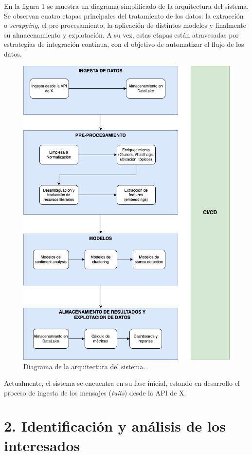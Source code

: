 \documentclass[
11pt, %
]{charter}
\begin{document}
En la figura 1 se muestra un diagrama simplificado de la arquitectura del sistema. Se observan cuatro etapas principales del tratamiento de los datos: la extracción o \textit{scrapping}, el pre-procesamiento, la aplicación de distintos modelos y finalmente su almacenamiento y explotación. A su vez, estas etapas están atravesadas por estrategias de integración continua, con el objetivo de automatizar el flujo de los datos.

\begin{figure}[H]
\centering 
\includegraphics[width=.75\textwidth]{./Figuras/arquitectura.png}
\caption{Diagrama de la arquitectura del sistema.}
\label{fig:diagBloques}
\end{figure}

Actualmente, el sistema se encuentra en su fase inicial, estando en desarrollo el proceso de ingesta de los mensajes (\textit{tuits}) desde la API de X.

\section{2. Identificación y análisis de los interesados}
\label{sec:interesados}
\end{document}
